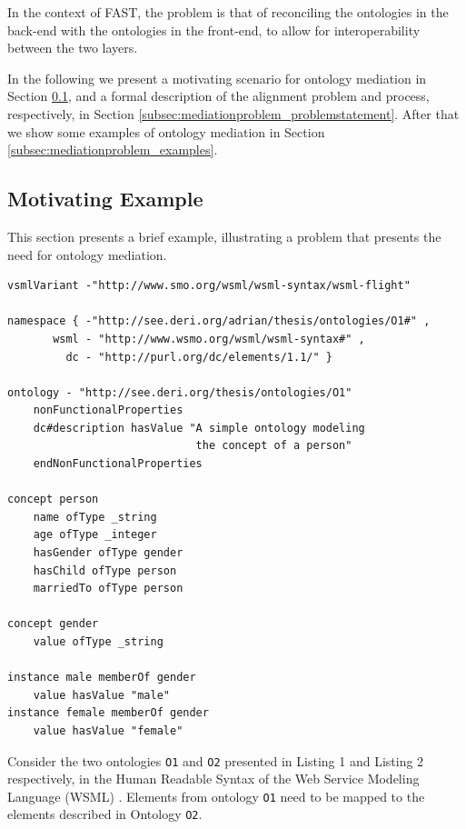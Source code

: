 \documentclass{fast_latex}
\begin{document}
In the context of FAST, the problem is that of reconciling the
ontologies in the back-end with the ontologies in the front-end, to
allow for interoperability between the two layers. 

In the following we present a motivating scenario for ontology mediation
in Section \ref{subsec:mediationproblem_motivatingexample}, and a formal description of the alignment problem and
process, respectively, in Section \ref{subsec:mediationproblem_problemstatement}. After that we show some examples
of ontology mediation in Section \ref{subsec:mediationproblem_examples}.

\subsection{Motivating Example}
\label{subsec:mediationproblem_motivatingexample}
This section presents a brief example, illustrating a problem that
presents the need for ontology mediation. 

\lstset{emphstyle=\textbf\textit\underbar}
\begin{lstlisting}
vsmlVariant -"http://www.smo.org/wsml/wsml-syntax/wsml-flight"

namespace { -"http://see.deri.org/adrian/thesis/ontologies/O1#" ,
       wsml - "http://www.wsmo.org/wsml/wsml-syntax#" ,
         dc - "http://purl.org/dc/elements/1.1/" }

ontology - "http://see.deri.org/thesis/ontologies/O1"
    nonFunctionalProperties
    dc#description hasValue "A simple ontology modeling
                             the concept of a person"
    endNonFunctionalProperties

concept person
    name ofType _string
    age ofType _integer
    hasGender ofType gender
    hasChild ofType person
    marriedTo ofType person

concept gender
    value ofType _string

instance male memberOf gender
    value hasValue "male"
instance female memberOf gender
    value hasValue "female"
\end{lstlisting}

Consider the two ontologies \texttt{O1} and
\texttt{O2} \cite{mocan2008mediation} presented in Listing 1 and
Listing 2 respectively, in the Human Readable Syntax of the Web Service
Modeling Language (WSML) \cite{debruin2005wsml}. Elements from
ontology \texttt{O1} need to be mapped to the elements
described in Ontology \texttt{O2}. 
\end{document}

